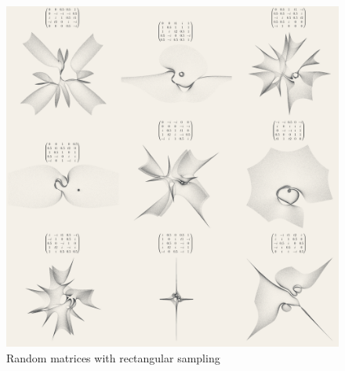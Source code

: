 \documentclass{article}
\begin{document}
\begin{figure}[htbp]
\centering
\includegraphics[width=\textwidth]{random_matrices.png}
\caption{Random matrices with rectangular sampling}
\end{figure}
\end{document}
